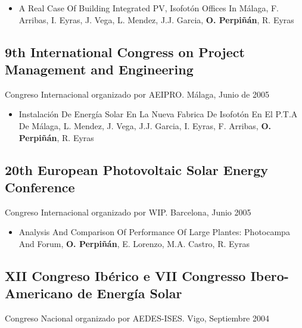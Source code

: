 \documentclass[article, a4paper]{memoir}
\begin{document}
\begin{itemize}
\item A Real Case Of Building Integrated PV, Isofotón Offices In Málaga, F. Arribas, I. Eyras, J. Vega, L. Mendez, J.J. Garcia, \textbf{O. Perpiñán}, R. Eyras
\end{itemize}

\subsection{9th International Congress on  Project Management and Engineering}
\label{sec:orgb3f798e}
Congreso Internacional organizado por AEIPRO. Málaga, Junio de 2005

\begin{itemize}
\item Instalación De Energía Solar En La Nueva Fabrica De Isofotón En El P.T.A De Málaga, L. Mendez, J. Vega, J.J. Garcia, I. Eyras, F. Arribas, \textbf{O. Perpiñán}, R. Eyras
\end{itemize}

\subsection{20th European Photovoltaic Solar Energy Conference}
\label{sec:org08a8008}
Congreso Internacional organizado por WIP. Barcelona, Junio 2005

\begin{itemize}
\item Analysis And Comparison Of Performance Of Large Plantes: Photocampa And Forum, \textbf{O. Perpiñán}, E. Lorenzo, M.A. Castro, R. Eyras
\end{itemize}

\subsection{XII Congreso Ibérico e VII Congresso Ibero-Americano de Energía Solar}
\label{sec:org9709c7a}
Congreso Nacional organizado por AEDES-ISES. Vigo, Septiembre 2004
\end{document}
